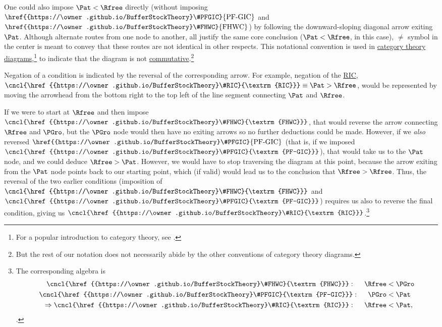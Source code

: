 \documentclass[\econtexRoot/BufferStockTheory]{subfiles}
\newcommand{\BSTlinkTo}{https://\owner.github.io/BufferStockTheory}
\renewcommand{\FHWC}{\href{{\BSTlinkTo}FHWC}{\textrm{FHWC}}}
\renewcommand{\FHWC}{\href{{\BSTlinkTo}\#FHWC}{\textrm{FHWC}}}
\renewcommand{\PFGIC}{\href{{\BSTlinkTo}\#PFGIC}{\textrm{PF-GIC}}}
\renewcommand{\RIC}{\href{{\BSTlinkTo}\#RIC}{\textrm{RIC}}}
\begin{document}
One could also impose $\Pat < \Rfree$ directly (without imposing $\PFGIC$ and $\FHWC$) by following the downward-sloping diagonal arrow exiting $\Pat$.  Although alternate routes from one node to another, all justify the same core conclusion ($\Pat < \Rfree$, in this case), $\neq$ symbol in the center is meant to convey that these routes are not identical in other respects.  This notational convention is used in \href{https://en.wikipedia.org/wiki/Diagram_(category_theory)}{category theory diagrams},\footnote{For a popular introduction to category theory, see \cite{riehl2017category}.} to indicate that the diagram is not \href{https://en.wikipedia.org/wiki/Commutative_diagram}{commutative}.\footnote{But the rest of our notation does not necessarily abide by the other conventions of category theory diagrams.}

Negation of a condition is indicated by the reversal of the corresponding arrow.  For example, negation of the {\RIC},  $\cncl{\RIC} \equiv \Pat > \Rfree$, would be represented by moving the arrowhead from the bottom right to the top left of the line segment connecting {$\Pat$} and $\Rfree$.

If we were to start at $\Rfree$ and then impose $\cncl{\FHWC}$, that would reverse the arrow connecting $\Rfree$ and $\PGro$, but the $\PGro$ node would then have no exiting arrows so no further deductions could be made.  However, if we \textit{also} reversed $\PFGIC$ (that is, if we imposed $\cncl{\PFGIC}$), that would take us to the $\Pat$ node, and we could deduce $\Rfree > \Pat$.  However, we would have to stop traversing the diagram at this point, because the arrow exiting from the $\Pat$ node points back to our starting point, which (if valid) would lead us to the conclusion that $\Rfree > \Rfree$.  Thus, the reversal of the two earlier conditions (imposition of $\cncl{\FHWC}$ and $\cncl{\PFGIC}$) requires us also to reverse the final condition, giving us $\cncl{\RIC}$.\footnote{The corresponding algebra is
\begin{equation}\begin{gathered}\begin{aligned}
  \cncl{\FHWC}:~~~~  \Rfree & < \PGro \notag  
  \\ \cncl{\PFGIC}:~~~~ \PGro & < \Pat %
                                \label{eq:cnclRIC}
  \\ \Rightarrow \cncl{\RIC}:~~~~\Rfree & < \Pat \notag,
\end{aligned}\end{gathered}\end{equation}.}
\end{document}
